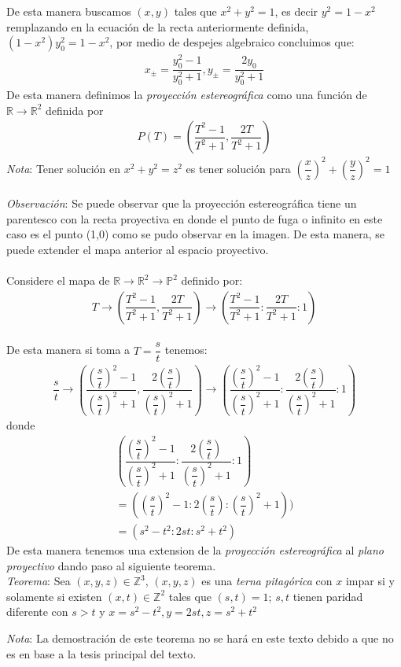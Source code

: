 \documentclass[10pt,a4paper]{article}
\begin{document}
De esta manera buscamos  $(x,y)$ tales que $x^2+y^2=1$, es decir $y^2=1-x^2$ remplazando en la ecuación de la recta anteriormente definida, $(1-x^2)y_{0}^{2}=1-x^2$, por medio de despejes algebraico concluimos que: 
\begin{align*}
 x_{\pm} = \dfrac{y^{2}_{0}-1}{{y^{2}_{0}+1}}  ,
 y_{\pm}=\dfrac{2y_{0}}{{y^{2}_{0}+1}} 
\end{align*}
 De esta manera definimos la \textit{proyección estereográfica} como una función de $\mathbb{R} \rightarrow \mathbb{R}^{2}$
definida por
\begin{align*}
P(T) = ( \dfrac{T^{2}-1}{T^{2}+1},\dfrac{2T}{T^{2}+1} )
\end{align*} 
\textit{Nota}: Tener solución en $x^2+y^2=z^2$ es tener solución para $(\dfrac{x}{z})^2+(\dfrac{y}{z})^2=1$
\\
\\
\textit{Observación}: Se puede observar que la proyección estereográfica tiene un parentesco con la recta proyectiva en donde el punto de fuga o infinito en este caso es el punto (1,0) como se pudo observar en la imagen. De esta manera, se puede extender el mapa anterior al espacio proyectivo. 
\\
\\ 
Considere el mapa de $\mathbb{R} \rightarrow \mathbb{R}^2 \rightarrow \mathbb{P}^2$ definido por:
\begin{align*}
 T \rightarrow (\dfrac{T^{2}-1}{T^{2}+1},\dfrac{2T}{T^{2}+1}) \rightarrow (\dfrac{T^{2}-1}{T^{2}+1}:\dfrac{2T}{T^{2}+1}:1)
\end{align*}
\\
De esta manera si toma a $T= \dfrac{s}{t}$ tenemos:
\begin{align*}
\dfrac{s}{t} \rightarrow (\dfrac{(\dfrac{s}{t})^{2}-1}{(\dfrac{s}{t})^{2}+1},\dfrac{2(\dfrac{s}{t})}{(\dfrac{s}{t})^{2}+1}) \rightarrow (\dfrac{(\dfrac{s}{t})^{2}-1}{(\dfrac{s}{t})^{2}+1}:\dfrac{2(\dfrac{s}{t})}{(\dfrac{s}{t})^{2}+1}:1)
\end{align*}
donde
\begin{align*}
(\dfrac{(\dfrac{s}{t})^{2}-1}{(\dfrac{s}{t})^{2}+1}:\dfrac{2(\dfrac{s}{t})}{(\dfrac{s}{t})^{2}+1}:1)\\
=((\dfrac{s}{t})^{2}-1:2(\dfrac{s}{t}):(\dfrac{s}{t})^{2}+1))\\
=(s^2-t^2:2st:s^2+t^2)
\end{align*}
De esta manera tenemos una extension de la \textit{proyección estereográfica} al \textit{plano proyectivo} dando paso al siguiente teorema.
\\

\textit{Teorema}: Sea $(x,y,z) \in \mathbb{Z}^3$, $(x,y,z)$ es una  \textit{terna pitagórica} con $x$ impar si y solamente si existen $(x,t) \in \mathbb{Z}^2$ tales que $(s,t)=1$; $s,t$ tienen paridad diferente con $s>t$ y $x=s^2-t^2, y=2st, z=s^2+t^2$

\textit{Nota}: La demostración de este teorema no se hará en este texto debido a que no es en base a la tesis principal del texto.  
\end{document}

